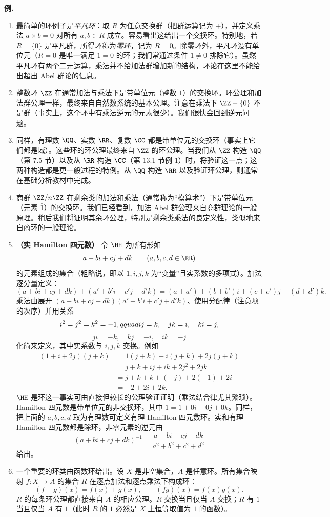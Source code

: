 \medskip
\noindent\textbf{例.}
\begin{enumerate}[label=(\arabic*)]
  \item 最简单的环例子是\emph{平凡环}：取 $R$ 为任意交换群（把群运算记为 $+$），并定义乘法 $a\times b=0$ 对所有 $a,b\in R$ 成立。容易看出这给出一个交换环。特别地，若 $R=\{0\}$ 是平凡群，所得环称为\emph{零环}，记为 $R=0$。除零环外，平凡环没有单位元（$R=0$ 是唯一满足 $1=0$ 的环；我们常通过条件 $1\neq0$ 排除它）。虽然平凡环有两个二元运算，乘法并不给加法群增加新的结构，环论在这里不能给出超出 Abel 群论的信息。
  \item 整数环 $\ZZ$ 在通常加法与乘法下是带单位元（整数 $1$）的交换环。环公理和加法群公理一样，最终来自自然数系统的基本公理。注意在乘法下 $\ZZ-\{0\}$ 不是群（事实上，这个环中有乘法逆元的元素很少）。我们很快会回到逆元问题。
  \item 同样，有理数 $\QQ$、实数 $\RR$、复数 $\CC$ 都是带单位元的交换环（事实上它们都是域）。这些环的环公理最终来自 $\ZZ$ 的环公理。当我们从 $\ZZ$ 构造 $\QQ$（第 7.5 节）以及从 $\RR$ 构造 $\CC$（第 13.1 节例 1）时，将验证这一点；这两种构造都是更一般过程的特例。从 $\QQ$ 构造 $\RR$ 以及验证环公理，则通常在基础分析教材中完成。
  \item 商群 $\ZZ/n\ZZ$ 在剩余类的加法和乘法（通常称为“模算术”）下是带单位元（元素 $\bar1$）的交换环。我们已经看到，加法 Abel 群公理来自商群理论的一般原理。稍后我们将证明其余环公理，特别是剩余类乘法的良定义性，类似地来自商环的一般理论。
  \item \textbf{（实 Hamilton 四元数）} 令 $\HH$ 为所有形如
  \[
    a+bi+cj+dk\qquad (a,b,c,d\in\RR)
  \]
  的元素组成的集合（粗略说，即以 $1,i,j,k$ 为“变量”且实系数的多项式）。加法逐分量定义：
  \[
  (a+bi+cj+dk)+(a'+b'i+c'j+d'k)
  =(a+a')+(b+b')i+(c+c')j+(d+d')k.
  \]
  乘法由展开 $(a+bi+cj+dk)(a'+b'i+c'j+d'k)$、使用分配律（注意项的次序）并用关系
  \[
    i^2=j^2=k^2=-1,\\qquad ij=k,
    \quad jk=i,\quad ki=j,
  \]
  \[
    ji=-k,
    \quad kj=-i,
    \quad ik=-j
  \]
  化简来定义，其中实系数与 $i,j,k$ 交换。例如
  \[
  \begin{aligned}
    (1+i+2j)(j+k)
    &=1(j+k)+i(j+k)+2j(j+k)\\
    &=j+k+ij+ik+2j^2+2jk\\
    &=j+k+k+(-j)+2(-1)+2i\\
    &=-2+2i+2k.
  \end{aligned}
  \]
  $\HH$ 是环这一事实可由直接但较长的公理验证证明（乘法结合律尤其繁琐）。Hamilton 四元数是带单位元的非交换环，其中 $1=1+0i+0j+0k$。同样，把上面的 $a,b,c,d$ 取为有理数可定义有理 Hamilton 四元数环。实和有理 Hamilton 四元数都是除环，非零元素的逆元由
  \[
    (a+bi+cj+dk)^{-1}=\frac{a-bi-cj-dk}{a^2+b^2+c^2+d^2}
  \]
  给出。
  \item 一个重要的环类由函数环给出。设 $X$ 是非空集合，$A$ 是任意环。所有集合映射 $f:X\to A$ 的集合 $R$ 在逐点加法和逐点乘法下构成环：
  \[
    (f+g)(x)=f(x)+g(x),\qquad (fg)(x)=f(x)g(x).
  \]
  $R$ 的每条环公理都直接来自 $A$ 的相应公理。$R$ 交换当且仅当 $A$ 交换；$R$ 有 $1$ 当且仅当 $A$ 有 $1$（此时 $R$ 的 $1$ 必然是 $X$ 上恒等取值为 $1$ 的函数）。


\end{enumerate}
